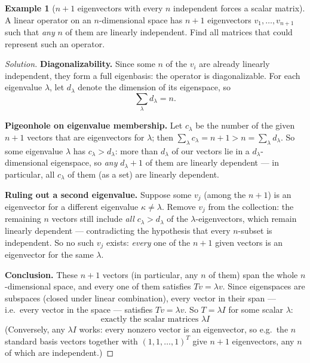\documentclass[11pt]{article}
\theoremstyle{definition}
\newtheorem{example}{Example}[section]
\begin{document}
\begin{example}[$n+1$ eigenvectors with every $n$ independent forces a scalar matrix]
A linear operator on an $n$-dimensional space has $n+1$ eigenvectors $v_1,\dots,v_{n+1}$ such that \emph{any} $n$ of them are linearly independent. Find all matrices that could represent such an operator.
\end{example}
\begin{proof}[Solution]
\textbf{Diagonalizability.} Since some $n$ of the $v_i$ are already linearly independent, they form a full eigenbasis: the operator is diagonalizable. For each eigenvalue $\lambda$, let $d_\lambda$ denote the dimension of its eigenspace, so
\[
\sum_\lambda d_\lambda=n.
\]

\textbf{Pigeonhole on eigenvalue membership.} Let $c_\lambda$ be the number of the given $n+1$ vectors that are eigenvectors for $\lambda$; then $\sum_\lambda c_\lambda=n+1>n=\sum_\lambda d_\lambda$. So some eigenvalue $\lambda$ has $c_\lambda>d_\lambda$: more than $d_\lambda$ of our vectors lie in a $d_\lambda$-dimensional eigenspace, so \emph{any} $d_\lambda+1$ of them are linearly dependent — in particular, all $c_\lambda$ of them (as a set) are linearly dependent.

\textbf{Ruling out a second eigenvalue.} Suppose some $v_j$ (among the $n+1$) is an eigenvector for a different eigenvalue $\kappa\ne\lambda$. Remove $v_j$ from the collection: the remaining $n$ vectors still include \emph{all} $c_\lambda>d_\lambda$ of the $\lambda$-eigenvectors, which remain linearly dependent — contradicting the hypothesis that every $n$-subset is independent. So no such $v_j$ exists: \emph{every} one of the $n+1$ given vectors is an eigenvector for the same $\lambda$.

\textbf{Conclusion.} These $n+1$ vectors (in particular, any $n$ of them) span the whole $n$-dimensional space, and every one of them satisfies $Tv=\lambda v$. Since eigenspaces are subspaces (closed under linear combination), every vector in their span — i.e.\ every vector in the space — satisfies $Tv=\lambda v$. So $T=\lambda I$ for some scalar $\lambda$:
\[
\boxed{\text{exactly the scalar matrices }\lambda I}
\]
(Conversely, any $\lambda I$ works: every nonzero vector is an eigenvector, so e.g.\ the $n$ standard basis vectors together with $(1,1,\dots,1)^T$ give $n+1$ eigenvectors, any $n$ of which are independent.)
\end{proof}
\end{document}
